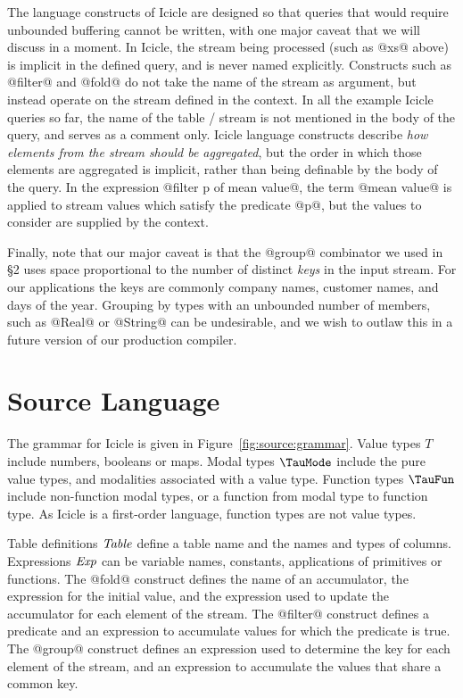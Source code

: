 The language constructs of Icicle are designed so that queries that would require unbounded buffering cannot be written, with one major caveat that we will discuss in a moment. In Icicle, the stream being processed (such as @xs@ above) is implicit in the defined query, and is never named explicitly. Constructs such as @filter@ and @fold@ do not take the name of the stream as argument, but instead operate on the stream defined in the context. In all the example Icicle queries so far, the name of the table / stream is not mentioned in the body of the query, and serves as a comment only. Icicle language constructs describe \emph{how elements from the stream should be aggregated}, but the order in which those elements are aggregated is implicit, rather than being definable by the body of the query. In the expression @filter p of mean value@, the term @mean value@ is applied to stream values which satisfy the predicate @p@, but the values to consider are supplied by the context.

Finally, note that our major caveat is that the @group@ combinator we used in \S2 uses space proportional to the number of distinct \emph{keys} in the input stream.
For our applications the keys are commonly company names, customer names, and days of the year.
Grouping by types with an unbounded number of members, such as @Real@ or @String@ can be undesirable, and we wish to outlaw this in a future version of our production compiler.


\eject
\section{Source Language}
\label{s:IcicleSource}





The grammar for Icicle is given in Figure~\ref{fig:source:grammar}. Value types $T$ include numbers, booleans or maps. Modal types $\TauMode$ include the pure value types, and modalities associated with a value type. Function types $\TauFun$ include non-function modal types, or a function from modal type to function type. As Icicle is a first-order language, function types are not value types.

Table definitions $\mathit{Table}$ define a table name and the names and types of columns. Expressions $\mathit{Exp}$ can be variable names, constants, applications of primitives or functions. The @fold@ construct defines the name of an accumulator, the expression for the initial value, and the expression used to update the accumulator for each element of the stream. The @filter@ construct defines a predicate and an expression to accumulate values for which the predicate is true. The @group@ construct defines an expression used to determine the key for each element of the stream, and an expression to accumulate the values that share a common key.

